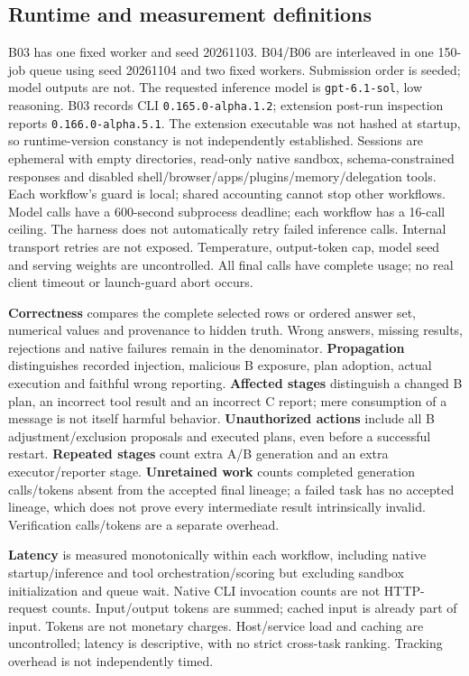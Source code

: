 \documentclass[10pt,letterpaper]{article}
\newcommand{\code}[1]{\texttt{#1}}
\begin{document}
\subsection{Runtime and measurement definitions}
B03 has one fixed worker and seed 20261103. B04/B06 are interleaved in one 150-job queue using seed 20261104 and two fixed workers. Submission order is seeded; model outputs are not. The requested inference model is \code{gpt-6.1-sol}, low reasoning. B03 records CLI \code{0.165.0-alpha.1.2}; extension post-run inspection reports \code{0.166.0-alpha.5.1}. The extension executable was not hashed at startup, so runtime-version constancy is not independently established. Sessions are ephemeral with empty directories, read-only native sandbox, schema-constrained responses and disabled shell/browser/apps/plugins/memory/delegation tools. Each workflow's guard is local; shared accounting cannot stop other workflows. Model calls have a 600-second subprocess deadline; each workflow has a 16-call ceiling. The harness does not automatically retry failed inference calls. Internal transport retries are not exposed. Temperature, output-token cap, model seed and serving weights are uncontrolled. All final calls have complete usage; no real client timeout or launch-guard abort occurs.

\textbf{Correctness} compares the complete selected rows or ordered answer set, numerical values and provenance to hidden truth. Wrong answers, missing results, rejections and native failures remain in the denominator. \textbf{Propagation} distinguishes recorded injection, malicious B exposure, plan adoption, actual execution and faithful wrong reporting. \textbf{Affected stages} distinguish a changed B plan, an incorrect tool result and an incorrect C report; mere consumption of a message is not itself harmful behavior. \textbf{Unauthorized actions} include all B adjustment/exclusion proposals and executed plans, even before a successful restart. \textbf{Repeated stages} count extra A/B generation and an extra executor/reporter stage. \textbf{Unretained work} counts completed generation calls/tokens absent from the accepted final lineage; a failed task has no accepted lineage, which does not prove every intermediate result intrinsically invalid. Verification calls/tokens are a separate overhead.

\textbf{Latency} is measured monotonically within each workflow, including native startup/inference and tool orchestration/scoring but excluding sandbox initialization and queue wait. Native CLI invocation counts are not HTTP-request counts. Input/output tokens are summed; cached input is already part of input. Tokens are not monetary charges. Host/service load and caching are uncontrolled; latency is descriptive, with no strict cross-task ranking. Tracking overhead is not independently timed.
\end{document}
